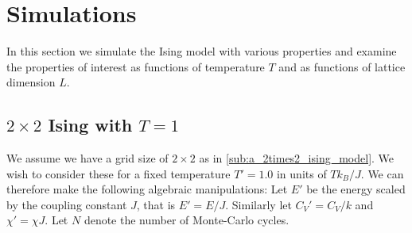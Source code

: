 \section{Simulations}
\label{sec:simulations}
In this section we simulate the Ising model with various properties and examine
the properties of interest as functions of temperature $T$ and as functions of
lattice dimension $L$.
\subsection{$2\times2$ Ising with $T = 1$}
\label{sub:_2x2_ising_with_t_1_}
We assume we have a grid size of $2\times2$ as in
\cref{sub:a_2times2_ising_model}. We wish to consider these for a fixed
temperature $T' = 1.0$ in units of $Tk_B / J$.  We can therefore make the
following algebraic manipulations: Let $E'$ be the energy scaled by the
coupling constant $J$, that is $E' = E / J$. Similarly let $C_V' = C_V / k$ and
$\chi' = \chi J$. Let $N$ denote the number of Monte-Carlo cycles.

